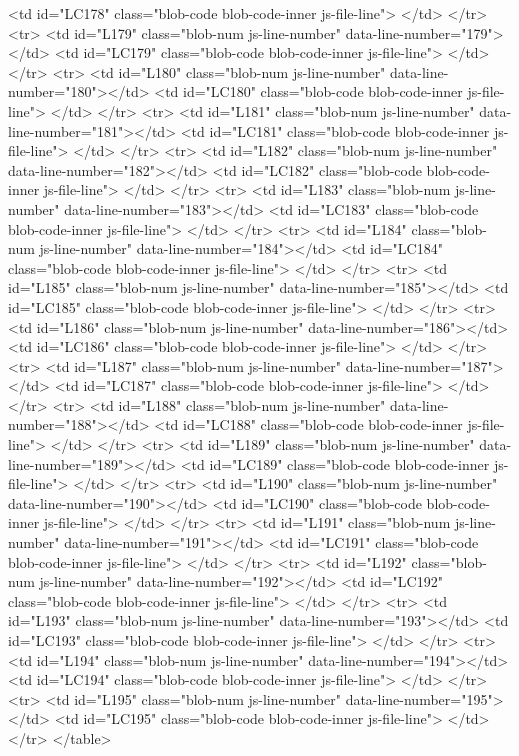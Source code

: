         <td id="LC178" class="blob-code blob-code-inner js-file-line">
</td>
      </tr>
      <tr>
        <td id="L179" class="blob-num js-line-number" data-line-number="179"></td>
        <td id="LC179" class="blob-code blob-code-inner js-file-line">
</td>
      </tr>
      <tr>
        <td id="L180" class="blob-num js-line-number" data-line-number="180"></td>
        <td id="LC180" class="blob-code blob-code-inner js-file-line">
</td>
      </tr>
      <tr>
        <td id="L181" class="blob-num js-line-number" data-line-number="181"></td>
        <td id="LC181" class="blob-code blob-code-inner js-file-line">
</td>
      </tr>
      <tr>
        <td id="L182" class="blob-num js-line-number" data-line-number="182"></td>
        <td id="LC182" class="blob-code blob-code-inner js-file-line">
</td>
      </tr>
      <tr>
        <td id="L183" class="blob-num js-line-number" data-line-number="183"></td>
        <td id="LC183" class="blob-code blob-code-inner js-file-line">
</td>
      </tr>
      <tr>
        <td id="L184" class="blob-num js-line-number" data-line-number="184"></td>
        <td id="LC184" class="blob-code blob-code-inner js-file-line">
</td>
      </tr>
      <tr>
        <td id="L185" class="blob-num js-line-number" data-line-number="185"></td>
        <td id="LC185" class="blob-code blob-code-inner js-file-line">
</td>
      </tr>
      <tr>
        <td id="L186" class="blob-num js-line-number" data-line-number="186"></td>
        <td id="LC186" class="blob-code blob-code-inner js-file-line">
</td>
      </tr>
      <tr>
        <td id="L187" class="blob-num js-line-number" data-line-number="187"></td>
        <td id="LC187" class="blob-code blob-code-inner js-file-line">
</td>
      </tr>
      <tr>
        <td id="L188" class="blob-num js-line-number" data-line-number="188"></td>
        <td id="LC188" class="blob-code blob-code-inner js-file-line">
</td>
      </tr>
      <tr>
        <td id="L189" class="blob-num js-line-number" data-line-number="189"></td>
        <td id="LC189" class="blob-code blob-code-inner js-file-line">
</td>
      </tr>
      <tr>
        <td id="L190" class="blob-num js-line-number" data-line-number="190"></td>
        <td id="LC190" class="blob-code blob-code-inner js-file-line">
</td>
      </tr>
      <tr>
        <td id="L191" class="blob-num js-line-number" data-line-number="191"></td>
        <td id="LC191" class="blob-code blob-code-inner js-file-line">
</td>
      </tr>
      <tr>
        <td id="L192" class="blob-num js-line-number" data-line-number="192"></td>
        <td id="LC192" class="blob-code blob-code-inner js-file-line">
</td>
      </tr>
      <tr>
        <td id="L193" class="blob-num js-line-number" data-line-number="193"></td>
        <td id="LC193" class="blob-code blob-code-inner js-file-line">
</td>
      </tr>
      <tr>
        <td id="L194" class="blob-num js-line-number" data-line-number="194"></td>
        <td id="LC194" class="blob-code blob-code-inner js-file-line">
</td>
      </tr>
      <tr>
        <td id="L195" class="blob-num js-line-number" data-line-number="195"></td>
        <td id="LC195" class="blob-code blob-code-inner js-file-line">
</td>
      </tr>
</table>


